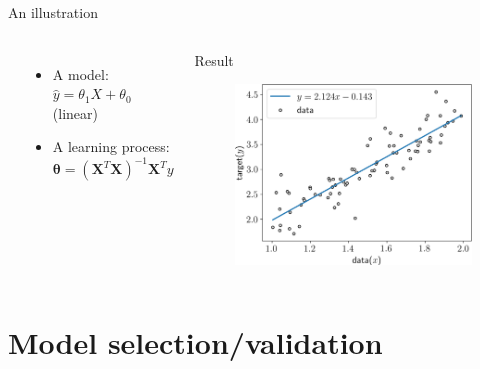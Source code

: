 \documentclass[handout, 10pt]{beamer}
\begin{document}
\begin{frame}{An illustration}
\begin{columns}
\begin{itemize}
\end{itemize}
\begin{itemize}
\pause
    \item A \alert{model}: $\hat{y} = \theta_1 X + \theta_0$ (linear)
\pause
    \item A \alert{learning} process:
    $\mathbf{\theta}=(\mathbf{X}^T\mathbf{X})^{-1}\mathbf{X}^Ty$
\end{itemize}
\pause
\begin{block}{Result}
    \begin{figure}
    \includegraphics[width=.9\textwidth]{fig/L1/interp-lin.png}
    \end{figure}
\end{block}
\end{columns}
\end{frame}


\section{Model selection/validation}
\end{document}
